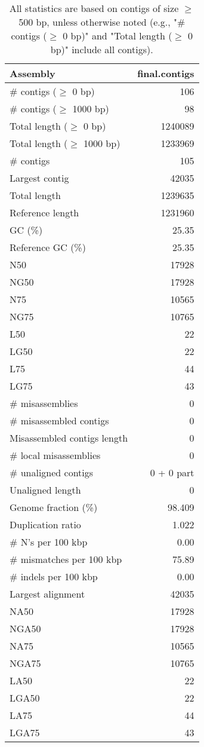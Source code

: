 \documentclass[12pt,a4paper]{article}
\begin{document}
\begin{table}[ht]
\begin{center}
\caption{All statistics are based on contigs of size $\geq$ 500 bp, unless otherwise noted (e.g., "\# contigs ($\geq$ 0 bp)" and "Total length ($\geq$ 0 bp)" include all contigs).}
\begin{tabular}{|l*{1}{|r}|}
\hline
Assembly & final.contigs \\ \hline
\# contigs ($\geq$ 0 bp) & 106 \\ \hline
\# contigs ($\geq$ 1000 bp) & 98 \\ \hline
Total length ($\geq$ 0 bp) & 1240089 \\ \hline
Total length ($\geq$ 1000 bp) & 1233969 \\ \hline
\# contigs & 105 \\ \hline
Largest contig & 42035 \\ \hline
Total length & 1239635 \\ \hline
Reference length & 1231960 \\ \hline
GC (\%) & 25.35 \\ \hline
Reference GC (\%) & 25.35 \\ \hline
N50 & 17928 \\ \hline
NG50 & 17928 \\ \hline
N75 & 10565 \\ \hline
NG75 & 10765 \\ \hline
L50 & 22 \\ \hline
LG50 & 22 \\ \hline
L75 & 44 \\ \hline
LG75 & 43 \\ \hline
\# misassemblies & 0 \\ \hline
\# misassembled contigs & 0 \\ \hline
Misassembled contigs length & 0 \\ \hline
\# local misassemblies & 0 \\ \hline
\# unaligned contigs & 0 + 0 part \\ \hline
Unaligned length & 0 \\ \hline
Genome fraction (\%) & 98.409 \\ \hline
Duplication ratio & 1.022 \\ \hline
\# N's per 100 kbp & 0.00 \\ \hline
\# mismatches per 100 kbp & 75.89 \\ \hline
\# indels per 100 kbp & 0.00 \\ \hline
Largest alignment & 42035 \\ \hline
NA50 & 17928 \\ \hline
NGA50 & 17928 \\ \hline
NA75 & 10565 \\ \hline
NGA75 & 10765 \\ \hline
LA50 & 22 \\ \hline
LGA50 & 22 \\ \hline
LA75 & 44 \\ \hline
LGA75 & 43 \\ \hline
\end{tabular}
\end{center}
\end{table}
\end{document}
